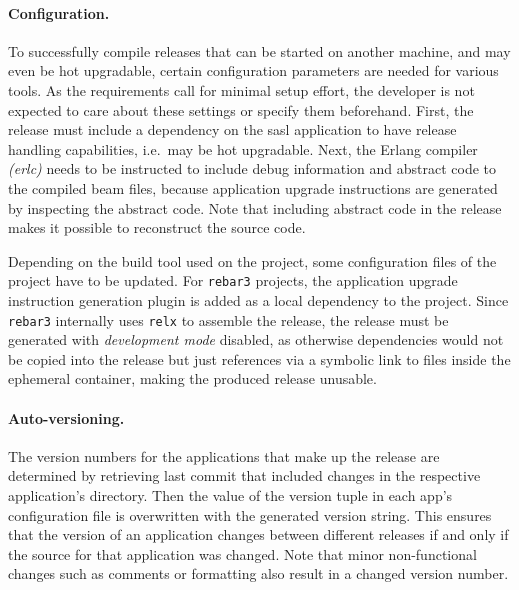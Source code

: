 \paragraph{Configuration.} To successfully compile releases that can be started on another machine, and may even be hot upgradable, certain configuration parameters are needed for various tools. As the requirements call for minimal setup effort, the developer is not expected to care about these settings or specify them beforehand. First, the release must include a dependency on the \acrfull{sasl} application to have release handling capabilities, i.e.~may be hot upgradable. Next, the Erlang compiler \emph{(erlc)} needs to be instructed to include debug information and abstract code to the compiled \acrshort{beam} files, because application upgrade instructions are generated by inspecting the abstract code. Note that including abstract code in the release makes it possible to reconstruct the source code.

Depending on the build tool used on the project, some configuration files of the project have to be updated. For \lstinline|rebar3| projects, the application upgrade instruction generation plugin is added as a local dependency to the project. Since \lstinline|rebar3| internally uses \lstinline|relx| to assemble the release, the release must be generated with \emph{development mode} disabled, as otherwise dependencies would not be copied into the release but just references via a symbolic link to files inside the ephemeral container, making the produced release unusable.

\paragraph{Auto-versioning.} The version numbers for the applications that make up the release are determined by retrieving last commit that included changes in the respective application's directory. Then the value of the version tuple in each app's configuration file is overwritten with the generated version string. This ensures that the version of an application changes between different releases if and only if the source for that application was changed. Note that minor non-functional changes such as comments or formatting also result in a changed version number.

